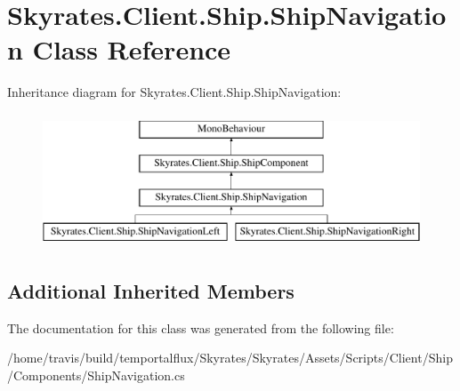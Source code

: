 \hypertarget{class_skyrates_1_1_client_1_1_ship_1_1_ship_navigation}{\section{Skyrates.\-Client.\-Ship.\-Ship\-Navigation Class Reference}
\label{class_skyrates_1_1_client_1_1_ship_1_1_ship_navigation}
}
Inheritance diagram for Skyrates.\-Client.\-Ship.\-Ship\-Navigation\-:\begin{figure}[H]
\begin{center}
\leavevmode
\includegraphics[height=4.000000cm]{class_skyrates_1_1_client_1_1_ship_1_1_ship_navigation}
\end{center}
\end{figure}
\subsection*{Additional Inherited Members}


The documentation for this class was generated from the following file\-:\begin{DoxyCompactItemize}
\item 
/home/travis/build/temportalflux/\-Skyrates/\-Skyrates/\-Assets/\-Scripts/\-Client/\-Ship/\-Components/Ship\-Navigation.\-cs\end{DoxyCompactItemize}
